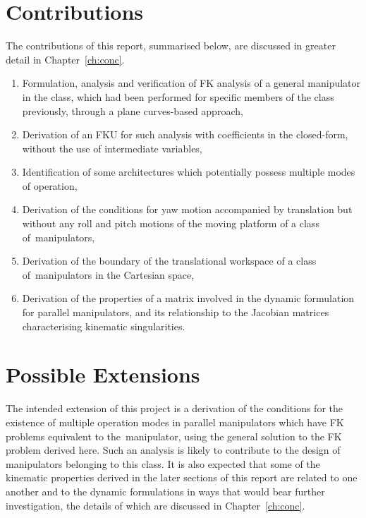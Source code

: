 \documentclass[DD]{iitmdiss}
\newcommand{\mref}[1]{\ref{#1}}
\begin{document}
\section{Contributions}
%
The contributions of this report, summarised below, are discussed in greater detail in Chapter~\mref{ch:conc}.
\begin{enumerate}
	\item Formulation, analysis and verification of FK analysis of a general manipulator in the class, which had been performed for specific members of the class previously, through a plane curves-based approach,
	\item Derivation of an FKU for such analysis with coefficients in the closed-form, without the use of intermediate variables,
	\item Identification of some architectures which potentially possess multiple modes of operation,
	\item Derivation of the conditions for yaw motion accompanied by translation but without any roll and pitch motions of the moving platform of a class of~\rps manipulators,
	\item Derivation of the boundary of the translational workspace of a class of~\rps manipulators in the Cartesian space,
	\item Derivation of the properties of a matrix involved in the dynamic formulation for parallel manipulators, and its relationship to the Jacobian matrices characterising kinematic singularities.
\end{enumerate}
%
\section{Possible Extensions}
%
The intended extension of this project is a derivation of the conditions for the existence of multiple operation modes in parallel manipulators which have FK problems equivalent to the~\rps manipulator, using the general solution to the FK problem derived here. Such an analysis is likely to contribute to the design of manipulators belonging to this class. It is also expected that some of the kinematic properties derived in the later sections of this report are related to one another and to the dynamic formulations in ways that would bear further investigation, the details of which are discussed in Chapter~\mref{ch:conc}.
%
\end{document}
